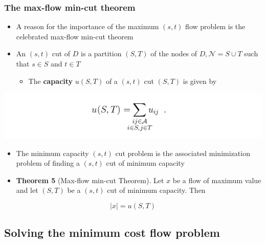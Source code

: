 \documentclass[11pt]{article}
\begin{document}
\subsubsection{The max-flow min-cut theorem}
\label{sec:orgbeac30f}
\begin{itemize}
\item A reason for the importance of the maximum \((s,t)\) flow problem is the celebrated max-flow min-cut theorem
\item An \((s,t)\) cut of \(D\) is a partition \((S,T)\) of the nodes of \(D,\mathcal N = S \cup T\) such that \(s \in S\) and \(t \in T\)
\begin{itemize}
\item The \textbf{capacity} \(u(S,T)\) of a \((s,t)\) cut \((S,T)\) is given by
\end{itemize}
\end{itemize}
\begin{center}
\includegraphics[width=.9\linewidth]{Network Flows/screenshot_2019-02-27_14-23-14.png}
\end{center}
\begin{itemize}
\item The minimum capacity \((s,t)\) cut problem is the associated minimization problem of finding a \((s,t)\) cut of minimum capacity
\end{itemize}
\begin{itemize}
\item \textbf{Theorem 5} (Max-flow min-cut Theorem). Let \(x\) be a flow of maximum value and let \((S,T)\) be a \((s,t)\) cut of minimum capacity. Then
\end{itemize}
\begin{equation}
  |x| = u(S,T)
\end{equation}

\subsection{Solving the minimum cost flow problem}
\label{sec:org4bef2b5}
\end{document}
